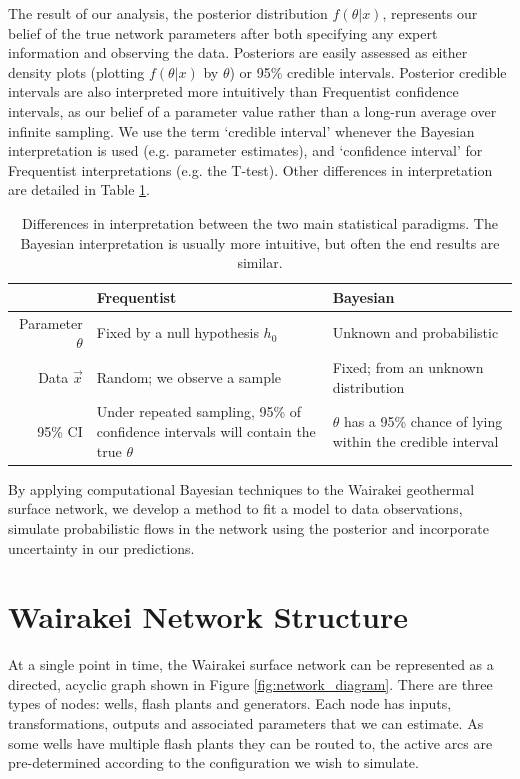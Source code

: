\documentclass[a4paper, 12pt]{article}
\begin{document}
The result of our analysis, the posterior distribution $f(\theta|x)$, represents our belief of the true network parameters after both specifying any expert information and observing the data. Posteriors are easily assessed as either density plots (plotting $f(\theta|x)$ by $\theta$) or 95\% credible intervals. Posterior credible intervals are also interpreted more intuitively than Frequentist confidence intervals, as our belief of a parameter value rather than a long-run average over infinite sampling. We use the term `credible interval' whenever the Bayesian interpretation is used (e.g. parameter estimates), and `confidence interval' for Frequentist interpretations (e.g. the T-test). Other differences in interpretation are detailed in Table \ref{tab:ci}.

\begin{table}
\centering
\begin{tabularx}{0.85\linewidth}{rXX}
\hline
 & Frequentist & Bayesian \\ 
  \hline
Parameter $\theta$ & Fixed by a null hypothesis $h_0$ & Unknown and probabilistic \\\hline
Data $\vec{x}$ & Random; we observe a sample & Fixed; from an unknown distribution \\\hline
95\% CI & Under repeated sampling, 95\% of confidence intervals will contain the true $\theta$ & $\theta$ has a 95\% chance of lying within the credible interval  \\
   \hline
\end{tabularx}
\caption{Differences in interpretation between the two main statistical paradigms. The Bayesian interpretation is usually more intuitive, but often the end results are similar.}
\label{tab:ci}
\end{table}

By applying computational Bayesian techniques to the Wairakei geothermal surface network, we develop a  method to fit a model to data observations, simulate probabilistic flows in the network using the posterior and incorporate uncertainty in our predictions.

\section{Wairakei Network Structure}

At a single point in time, the Wairakei surface network can be represented as a directed, acyclic graph shown in Figure \ref{fig:network_diagram}. There are three types of nodes: wells, flash plants and generators. Each node has inputs, transformations,  outputs and associated parameters that we can estimate. As some wells have multiple flash plants they can be routed to, the active arcs are pre-determined according to the configuration we wish to simulate.
\end{document}
